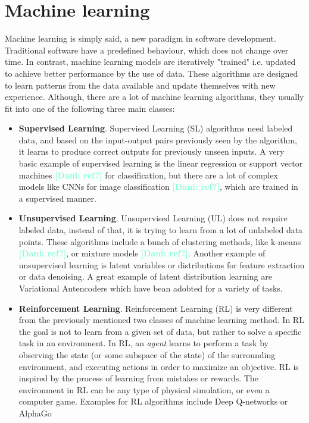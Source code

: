 \documentclass[12pt, a4paper,  nobibnotes]{article}
\newcommand{\nd}[1]{\textcolor{Aquamarine}{\textbf{[Dani: #1]}}}
\begin{document}
\section{Machine learning}

Machine learning is simply said, a new paradigm in software development. Traditional software have
a predefined behaviour, which does not change over time. In contrast, machine learning models
are iteratively "trained" i.e. updated to achieve better performance by the use of data. These algorithms
are designed to learn patterns from the data available and update themselves with new experience.
Although, there are a lot of machine learning algorithms, they usually fit into one of the following three 
main classes:
\begin{itemize}
    \item \textbf{Supervised Learning}. Supervised Learning (SL) algorithms need labeled data, and
    based on the input-output pairs previously seen by the algorithm, it learns to produce
    correct outputs for previously unseen inputs. A very basic example of supervised learning 
    is the linear regression or support vector machines \nd{ref?} for classification, but there are a lot of complex models like CNNs for image classification
    \nd{ref?}, which are trained in a supervised manner.  
    \item \textbf{Unsupervised Learning}. Unsupervised Learning (UL) does not require labeled data, instead
    of that, it is trying to learn from a lot of unlabeled data points. These algorithms include a bunch
    of clustering methods, like k-means \nd{ref?}, or mixture models \nd{ref?}. Another example of unsupervised
    learning is latent variables or distributions for feature extraction or data denoising. A great example 
    of latent distribution learning are Variational Autencoders \cite{VAEPaper} which have bean adobted 
    for a variety of tasks.
    \item \textbf{Reinforcement Learning}. Reinforcement Learning (RL) is very different from the previously
    mentioned two classes of machine learning method. In RL the goal is not to learn from a given set of 
    data, but rather to solve a specific task in an environment. In RL, an \textit{agent} learns to 
    perform a task by observing the state (or some subspace of the state) of the surrounding environment,
    and executing actions in order to maximize an objective. RL is inspired by the process of learning from 
    mistakes or rewards. The environment in RL can be any type of physical simulation, or even a computer game.
    Examples for RL algorithms include Deep Q-networks \cite{RLAtariDQN} or AlphaGo \cite{Silver2016AlphaGo}
\end{itemize}
\end{document}
